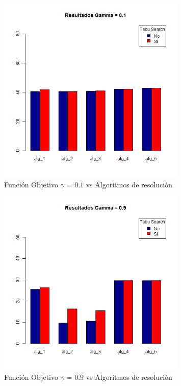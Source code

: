 \begin{figure}[H]
  \centering
    \includegraphics[width=0.8\textwidth]{resultados/cities/Graficos_agrupados/gamma01-cities.png}
  \caption{Función Objetivo $\gamma$ = $0.1$ vs Algoritmos de resolución}
  \label{res:img-cities-agr-gamma01}
\end{figure}

\begin{figure}[H]
  \centering
    \includegraphics[width=0.8\textwidth]{resultados/cities/Graficos_agrupados/gamma09-cities.png}
  \caption{Función Objetivo $\gamma$ = $0.9$ vs Algoritmos de resolución}
  \label{res:img-cities-agr-gamma09}
\end{figure}

